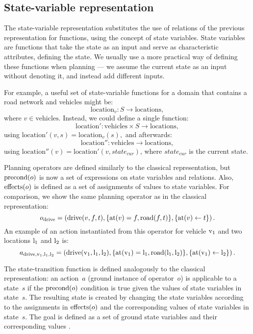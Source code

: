 \subsection{State-variable representation}

The state-variable representation substitutes the use of relations of the previous
representation for functions,
using the concept of state variables. State variables are functions
that take the state as an input and serve as characteristic attributes, defining the state. We usually use a more practical way of defining these functions when planning --- we assume
the current state as an input without denoting it, and instead add different inputs.

For example, a useful set of state-variable functions for a domain that contains a road
network and vehicles might be: $$\mathrm{location}_{v}: S \to \mathrm{locations},$$
where $v \in \mathrm{vehicles}$.
Instead, we could define a single function:
$$\mathrm{location'}: \mathrm{vehicles} \times S \to \mathrm{locations},$$
using $\mathrm{location}'(v, s) = \mathrm{location}_v(s),$ and afterwards:
$$\mathrm{location''}: \mathrm{vehicles} \to \mathrm{locations},$$
using $\mathrm{location''}(v) = \mathrm{location'}(v, state_{cur})$, where $state_{cur}$ is the current state.

Planning operators are defined similarly to the classical representation, but
$\operatorname{\textrm{precond}}(o)$ is now a set of expressions on state variables and relations.
Also, $\operatorname{\textrm{effects}}(o)$ is defined as a set of assignments of values to state variables.
For comparison, we show the same planning operator as in the classical representation:
$$o_{\textrm{drive}} = \left(\textrm{drive}(v, f, t), \{\textrm{at}(v) = f, \textrm{road}(f, t)\}, \{\textrm{at}(v) \leftarrow t\}\right).$$
An example of an action instantiated from this operator
for vehicle $\textrm{v}_1$ and two locations $\textrm{l}_1$ and $\textrm{l}_2$ is:
$$a_{\textrm{drive}, \textrm{v}_1, \textrm{l}_1, \textrm{l}_2} = \left(\textrm{drive}(\textrm{v}_1, \textrm{l}_1, \textrm{l}_2), \{\textrm{at}(\textrm{v}_1) = \textrm{l}_1,
\textrm{road}(\textrm{l}_1, \textrm{l}_2)\}, \{\textrm{at}(\textrm{v}_1) \leftarrow \textrm{l}_2\}\right).$$

The state-transition function is defined analogously to the classical representation: an action~$a$ (ground instance
of operator~$o$)
is applicable to a state~$s$ if the $\operatorname{\textrm{precond}}(o)$ condition is true given the values
of state variables in state~$s$. The resulting state is created by changing the state variables
according to the assignments in $\operatorname{\textrm{effects}}(o)$ and the corresponding values of state
variables in state~$s$.
The goal is defined as a set of ground state variables and their corresponding values
\citep[Section~2.5.2]{Ghallab2004}.


